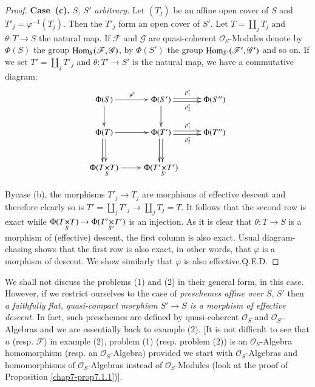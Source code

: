 \begin{proof}
\medskip
{\bf Case~(c).} {\em $S$, $S'$ arbitrary.} Let $(T_{j})$ be an affine
open cover of $S$ and $T'_{j}=\varphi^{-1}(T_{j})$. Then the $T'_{j}$
form an open cover of $S'$. Let $T=\coprod\limits_{j}T_{j}$ and
$\theta:T\to S$ the natural map. If $\mathscr{F}$ and $\mathscr{G}$
are quasi-coherent $\mathscr{O}_{S}$-Modules denote by $\Phi(S)$ the
group $\operatorname{Hom}_{S}(\mathscr{F},\mathscr{G})$, by $\Phi(S')$ the group
$\operatorname{Hom}_{S'}(\mathscr{F}',\mathscr{G}')$ and so on. If we set
$T'=\coprod\limits_{j}T'_{j}$ and $\theta:T'\to S'$ is the natural
map, we have a commutative diagram:
\[
\xymatrix{
\Phi(S)\ar[d]\ar[r]^{\varphi^{\ast}} &
\Phi(S')\ar[d]\ar@<.2em>[r]^{p^{\ast}_{1}}\ar@<-.2em>[r]_{p^{\ast}_{2}}
& \Phi(S'')\\
\Phi(T)\ar[r]\ar@<.2em>[d]\ar@<-.2em>[d] &
\Phi(T')\ar@<.2em>[r]^{p^{\ast}_{1}}\ar@<-.2em>[r]_{p^{\ast}_{2}}
\ar@<.2em>[d]\ar@<-.2em>[d] &
\Phi(T'')\\
\Phi(\fprod{T}{T}{S})\ar[r] & \Phi(\fprod{T'}{T'}{S'}) & 
}
\]

By\pageoriginale case (b), the morphisms $T'_{j}\to T_{j}$ are
morphisms of effective descent and therefore clearly so is
$T'=\coprod\limits_{j}T'_{j}\to \coprod\limits_{j}T_{j}=T$. It follows
that the second row is exact while $\Phi(\fprod{T}{T}{S})\to
\Phi(\fprod{T'}{T'}{S'})$ is an injection. As it is clear that
$\theta:T\to S$ is a morphism of (effective) descent, the first column
is also exact. Usual diagram-chasing shows that the first row is also
exact, in other words, that $\varphi$ is a morphism of descent. We
show similarly that $\varphi$ is also effective.\hfill Q.E.D.
\end{proof}

\begin{exam}%
We shall not discuss the problems (1) and (2) in their general form,
in this case. However, if we restrict ourselves to the case of {\em
  preschemes affine over} $S$, $S'$ then {\em a faithfully flat,
  quasi-compact morphism $S'\to S$ is a morphism of effective
  descent.} In fact, such preschemes are defined by quasi-coherent
$\mathscr{O}_{S}$-and $\mathscr{O}_{S'}$-Algebras and we are
essentially back to example (2). [It is not difficult to see that $u$
  (resp. $\mathscr{F}$) in example (2), problem (1) (resp. problem
  (2)) is an $\mathscr{O}_{S}$-Algebra homomorphism (resp. an
  $\mathscr{O}_{S}$-Algebra) provided we start with
  $\mathscr{O}_{S}$-Algebras and homomorphisms of
  $\mathscr{O}_{S}$-Algebras instead of $\mathscr{O}_{S}$-Modules
  (look at the proof of Proposition \ref{chap7-prop7.1.1})].
\end{exam}



